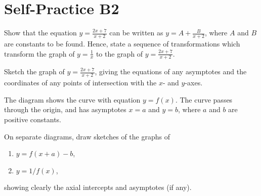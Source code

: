\section{Self-Practice B2}

\begin{problem}
    Show that the equation $y=\frac{2x+7}{x+2}$ can be written as $y=A+\frac{B}{x+2}$, where $A$ and $B$ are constants to be found. Hence, state a sequence of transformations which transform the graph of $y=\frac{1}{x}$ to the graph of $y=\frac{2x+7}{x+2}$.

    Sketch the graph of $y=\frac{2x+7}{x+2}$, giving the equations of any asymptotes and the coordinates of any points of intersection with the $x$- and $y$-axes.
\end{problem}

\begin{problem}
    The diagram shows the curve with equation $y=f(x)$. The curve passes through the origin, and has asymptotes $x=a$ and $y=b$, where $a$ and $b$ are positive constants.
    
    \begin{figure}[H]
        \centering
        \caption{}
    \end{figure}

    On separate diagrams, draw sketches of the graphs of
    \begin{enumerate}
        \item $y = f(x + a) - b$,
        \item $y = 1/f(x)$,
    \end{enumerate}
    showing clearly the axial intercepts and asymptotes (if any).
\end{problem}

